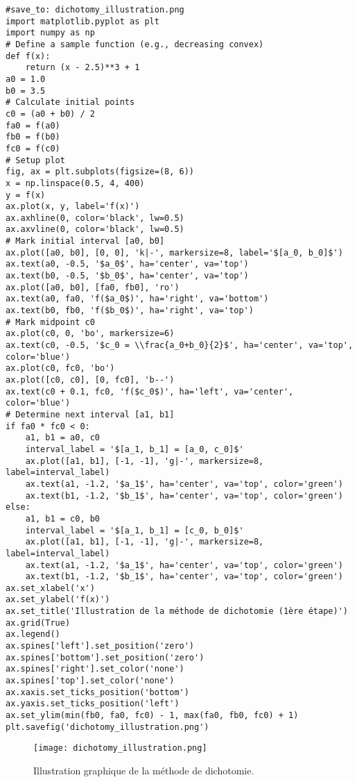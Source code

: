 \documentclass{article}
\begin{document}
\begin{verbatim}
#save_to: dichotomy_illustration.png
import matplotlib.pyplot as plt
import numpy as np
# Define a sample function (e.g., decreasing convex)
def f(x):
    return (x - 2.5)**3 + 1
a0 = 1.0
b0 = 3.5
# Calculate initial points
c0 = (a0 + b0) / 2
fa0 = f(a0)
fb0 = f(b0)
fc0 = f(c0)
# Setup plot
fig, ax = plt.subplots(figsize=(8, 6))
x = np.linspace(0.5, 4, 400)
y = f(x)
ax.plot(x, y, label='f(x)')
ax.axhline(0, color='black', lw=0.5)
ax.axvline(0, color='black', lw=0.5)
# Mark initial interval [a0, b0]
ax.plot([a0, b0], [0, 0], 'k|-', markersize=8, label='$[a_0, b_0]$')
ax.text(a0, -0.5, '$a_0$', ha='center', va='top')
ax.text(b0, -0.5, '$b_0$', ha='center', va='top')
ax.plot([a0, b0], [fa0, fb0], 'ro')
ax.text(a0, fa0, 'f($a_0$)', ha='right', va='bottom')
ax.text(b0, fb0, 'f($b_0$)', ha='right', va='top')
# Mark midpoint c0
ax.plot(c0, 0, 'bo', markersize=6)
ax.text(c0, -0.5, '$c_0 = \\frac{a_0+b_0}{2}$', ha='center', va='top', color='blue')
ax.plot(c0, fc0, 'bo')
ax.plot([c0, c0], [0, fc0], 'b--')
ax.text(c0 + 0.1, fc0, 'f($c_0$)', ha='left', va='center', color='blue')
# Determine next interval [a1, b1]
if fa0 * fc0 < 0:
    a1, b1 = a0, c0
    interval_label = '$[a_1, b_1] = [a_0, c_0]$'
    ax.plot([a1, b1], [-1, -1], 'g|-', markersize=8, label=interval_label)
    ax.text(a1, -1.2, '$a_1$', ha='center', va='top', color='green')
    ax.text(b1, -1.2, '$b_1$', ha='center', va='top', color='green')
else:
    a1, b1 = c0, b0
    interval_label = '$[a_1, b_1] = [c_0, b_0]$'
    ax.plot([a1, b1], [-1, -1], 'g|-', markersize=8, label=interval_label)
    ax.text(a1, -1.2, '$a_1$', ha='center', va='top', color='green')
    ax.text(b1, -1.2, '$b_1$', ha='center', va='top', color='green')
ax.set_xlabel('x')
ax.set_ylabel('f(x)')
ax.set_title('Illustration de la méthode de dichotomie (1ère étape)')
ax.grid(True)
ax.legend()
ax.spines['left'].set_position('zero')
ax.spines['bottom'].set_position('zero')
ax.spines['right'].set_color('none')
ax.spines['top'].set_color('none')
ax.xaxis.set_ticks_position('bottom')
ax.yaxis.set_ticks_position('left')
ax.set_ylim(min(fb0, fa0, fc0) - 1, max(fa0, fb0, fc0) + 1)
plt.savefig('dichotomy_illustration.png')
\end{verbatim}

\begin{figure}[H]
\centering
\texttt{[image: dichotomy\_illustration.png]}
\caption{Illustration graphique de la méthode de dichotomie.}
\label{fig:dichotomie}
\end{figure}
\end{document}
